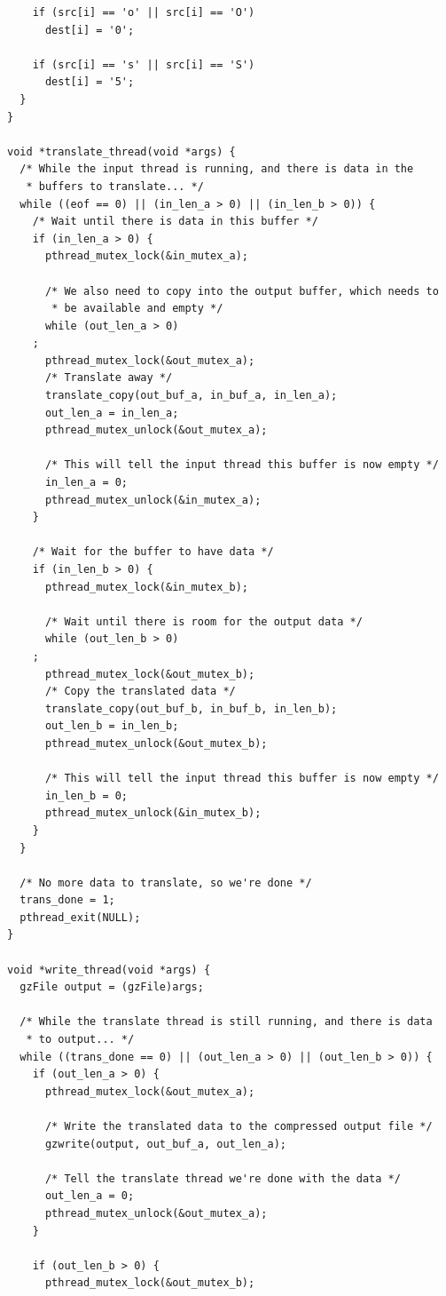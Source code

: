 \documentclass[a4paper,12pt]{article}
\begin{document}
\begin{verbatim}
    if (src[i] == 'o' || src[i] == 'O')
      dest[i] = '0';

    if (src[i] == 's' || src[i] == 'S')
      dest[i] = '5';
  }
}

void *translate_thread(void *args) {
  /* While the input thread is running, and there is data in the
   * buffers to translate... */
  while ((eof == 0) || (in_len_a > 0) || (in_len_b > 0)) {
    /* Wait until there is data in this buffer */
    if (in_len_a > 0) {
      pthread_mutex_lock(&in_mutex_a);

      /* We also need to copy into the output buffer, which needs to
       * be available and empty */
      while (out_len_a > 0)
	;
      pthread_mutex_lock(&out_mutex_a);
      /* Translate away */
      translate_copy(out_buf_a, in_buf_a, in_len_a);
      out_len_a = in_len_a;
      pthread_mutex_unlock(&out_mutex_a);

      /* This will tell the input thread this buffer is now empty */
      in_len_a = 0;
      pthread_mutex_unlock(&in_mutex_a);
    }
    
    /* Wait for the buffer to have data */
    if (in_len_b > 0) {
      pthread_mutex_lock(&in_mutex_b);

      /* Wait until there is room for the output data */
      while (out_len_b > 0)
	;
      pthread_mutex_lock(&out_mutex_b);
      /* Copy the translated data */
      translate_copy(out_buf_b, in_buf_b, in_len_b);
      out_len_b = in_len_b;
      pthread_mutex_unlock(&out_mutex_b);

      /* This will tell the input thread this buffer is now empty */
      in_len_b = 0;
      pthread_mutex_unlock(&in_mutex_b);
    }
  }

  /* No more data to translate, so we're done */
  trans_done = 1;
  pthread_exit(NULL);
}

void *write_thread(void *args) {
  gzFile output = (gzFile)args;

  /* While the translate thread is still running, and there is data
   * to output... */
  while ((trans_done == 0) || (out_len_a > 0) || (out_len_b > 0)) {
    if (out_len_a > 0) {
      pthread_mutex_lock(&out_mutex_a);

      /* Write the translated data to the compressed output file */
      gzwrite(output, out_buf_a, out_len_a);

      /* Tell the translate thread we're done with the data */
      out_len_a = 0;
      pthread_mutex_unlock(&out_mutex_a);
    }

    if (out_len_b > 0) {
      pthread_mutex_lock(&out_mutex_b);


\end{verbatim}
\end{document}
